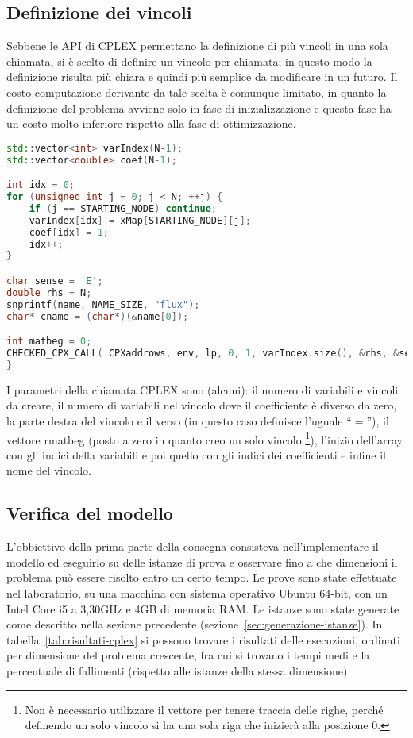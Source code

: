 \subsection{Definizione dei vincoli}
Sebbene le API di CPLEX permettano la definizione di più vincoli in una sola chiamata, si è scelto di definire un vincolo per chiamata;
in questo modo la definizione risulta più chiara e quindi più semplice da modificare in un futuro.
Il costo computazione derivante da tale scelta è comunque limitato, in quanto la definizione del problema avviene solo in fase di inizializzazione
e questa fase ha un costo molto inferiore rispetto alla fase di ottimizzazione.
%
\label{lst:cplex-vincoli}
\begin{lstlisting}[language=C++, caption=Creazione di un vincolo]
std::vector<int> varIndex(N-1);
std::vector<double> coef(N-1);

int idx = 0;
for (unsigned int j = 0; j < N; ++j) {
	if (j == STARTING_NODE) continue;
	varIndex[idx] = xMap[STARTING_NODE][j];
	coef[idx] = 1;
	idx++;
}

char sense = 'E';
double rhs = N;
snprintf(name, NAME_SIZE, "flux");
char* cname = (char*)(&name[0]);

int matbeg = 0;
CHECKED_CPX_CALL( CPXaddrows, env, lp, 0, 1, varIndex.size(), &rhs, &sense, &matbeg, &varIndex[0], &coef[0], NULL, &cname );
}
\end{lstlisting}
%
I parametri della chiamata CPLEX sono (alcuni): il numero di variabili e vincoli da creare, il numero di variabili nel vincolo dove il coefficiente è
diverso da zero, la parte destra del vincolo e il verso (in questo caso definisce l'uguale ``$=$''), il vettore \textsf{rmatbeg} (posto a zero in quanto creo un solo vincolo
\footnote{Non è necessario utilizzare il vettore per tenere traccia delle righe, perché definendo un solo vincolo si ha una sola riga che inizierà alla posizione 0.}),
l'inizio dell'array con gli indici della variabili e poi quello con gli indici dei coefficienti e infine il nome del vincolo.
\subsection{Verifica del modello}\label{subsec:verifica-modello-cplex}
L'obbiettivo della prima parte della consegna consisteva nell'implementare il modello ed eseguirlo su delle istanze di prova
e osservare fino a che dimensioni il problema può essere risolto entro un certo tempo.
Le prove sono state effettuate nel laboratorio, su una macchina con sistema operativo Ubuntu 64-bit,
con un Intel Core i5 a 3,30GHz e 4GB di memoria RAM.
Le istanze sono state generate come descritto nella sezione precedente (sezione~\ref{sec:generazione-istanze}).
In tabella~\ref{tab:risultati-cplex} si possono trovare i risultati delle esecuzioni, ordinati per dimensione
del problema crescente, fra cui si trovano i tempi medi e la percentuale di fallimenti (rispetto alle istanze della stessa dimensione).

